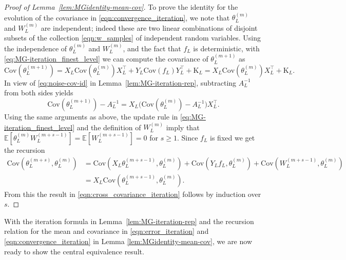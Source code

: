 \documentclass[11pt,english]{article}
\theoremstyle{plain}
\theoremstyle{plain}
\theoremstyle{plain}
\theoremstyle{plain}
\numberwithin{equation}{section}
\newcommand*{\WCov}{\mathrm{K}}
\begin{document}
\begin{proof}[Proof of Lemma~\ref{lem:MGidentity-mean-cov}]
	To prove the identity for the evolution of the covariance in \eqref{eqn:convergence_iteration},
	we note that
	$\theta_L^{(m)}$ and $W_L^{(m)}$ are independent; indeed these are two linear combinations of disjoint subsets of the collection  \eqref{eqn:w_samples} of independent random variables.
	Using the independence of $\theta_L^{(m)}$ and $W_L^{(m)}$,
	and the fact that $f_L$ is deterministic,
	with \eqref{eq:MG-iteration_finest_level} we can compute the covariance of $\theta_{L}^{(m+1)}$ as
	\[
		\mathrm{Cov}(\theta_{L}^{(m+1)})=X_{L}\mathrm{Cov}(\theta_{L}^{(m)})X_{L}^{\top}+Y_{L}\mathrm{Cov}(f_{L})Y_{L}^{\top}+\WCov_{L}=X_{L}\mathrm{Cov}(\theta_{L}^{(m)})X_{L}^{\top}+\WCov_{L}.
	\]
	In view of \eqref{eq:noise-cov-id} in Lemma~\ref{lem:MG-iteration-rep}, subtracting $A_{L}^{-1}$
	from both sides yields
	\[
		\mathrm{Cov}(\theta_{L}^{(m+1)})-A_{L}^{-1}=X_{L}\bigl(\mathrm{Cov}(\theta_{L}^{(m)})-A_{L}^{-1}\bigr)X_{L}^{\top}.
	\]
	Using the same arguments as above, the update rule in \eqref{eq:MG-iteration_finest_level} and the definition of $W_L^{(m)}$ imply that $\mathbb{E}[\theta_{L}^{(m)}W_{L}^{(m+s-1)}]=\mathbb{E}[W_{L}^{(m+s-1)}]=0$ for $s\ge1$. Since $f_L$ is fixed we get the recursion
	\begin{align*}
		\mathrm{Cov}(\theta_{L}^{(m+s)},\theta_{L}^{(m)}) & =\mathrm{Cov}(X_{L}\theta_{L}^{(m+s-1)},\theta_{L}^{(m)})+\mathrm{Cov}(Y_{L}f_{L},\theta_{L}^{(m)})+\mathrm{Cov}(W_{L}^{(m+s-1)},\theta_{L}^{(m)}) \\
		                                                  & =X_{L}\mathrm{Cov}(\theta_{L}^{(m+s-1)},\theta_{L}^{(m)}).
	\end{align*}
	From this the result in \eqref{eqn:cross_covariance_iteration} follows by induction over $s$.
\end{proof}
With the iteration formula in Lemma~\ref{lem:MG-iteration-rep} and the recursion relation for the mean and covariance in \eqref{eqn:error_iteration} and \eqref{eqn:convergence_iteration} in Lemma \ref{lem:MGidentity-mean-cov}, we are now ready to show the central equivalence result.
\end{document}
